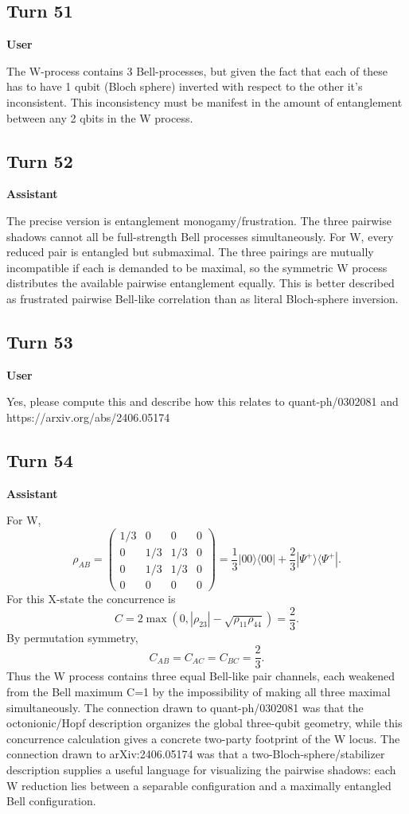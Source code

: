 \documentclass[11pt,a4paper]{article}
\newcommand{\speaker}[1]{\par\medskip\noindent\textbf{\large #1}\par\smallskip}
\begin{document}
\subsection*{Turn 51}
\speaker{User}
The W-process contains 3 Bell-processes, but given the fact that each of these has to have 1 qubit (Bloch sphere) inverted with respect to the other it's inconsistent. This inconsistency must be manifest in the amount of entanglement between any 2 qbits in the W process.
\subsection*{Turn 52}
\speaker{Assistant}
The precise version is entanglement monogamy/frustration. The three pairwise shadows cannot all be full-strength Bell processes simultaneously. For W, every reduced pair is entangled but submaximal. The three pairings are mutually incompatible if each is demanded to be maximal, so the symmetric W process distributes the available pairwise entanglement equally. This is better described as frustrated pairwise Bell-like correlation than as literal Bloch-sphere inversion.
\subsection*{Turn 53}
\speaker{User}
Yes, please compute this and describe how this relates to quant-ph/0302081 and https://arxiv.org/abs/2406.05174
\subsection*{Turn 54}
\speaker{Assistant}
For W,
\[
\rho_{AB}=\begin{pmatrix}
1/3&0&0&0\\
0&1/3&1/3&0\\
0&1/3&1/3&0\\
0&0&0&0
\end{pmatrix}
=\frac13|00\rangle\langle00|+\frac23|\Psi^+\rangle\langle\Psi^+|.
\]
For this X-state the concurrence is
\[
C=2\max(0,|\rho_{23}|-\sqrt{\rho_{11}\rho_{44}})=\frac23.
\]
By permutation symmetry,
\[
C_{AB}=C_{AC}=C_{BC}=\frac23.
\]
Thus the W process contains three equal Bell-like pair channels, each weakened from the Bell maximum C=1 by the impossibility of making all three maximal simultaneously. The connection drawn to quant-ph/0302081 was that the octonionic/Hopf description organizes the global three-qubit geometry, while this concurrence calculation gives a concrete two-party footprint of the W locus. The connection drawn to arXiv:2406.05174 was that a two-Bloch-sphere/stabilizer description supplies a useful language for visualizing the pairwise shadows: each W reduction lies between a separable configuration and a maximally entangled Bell configuration.
\end{document}
